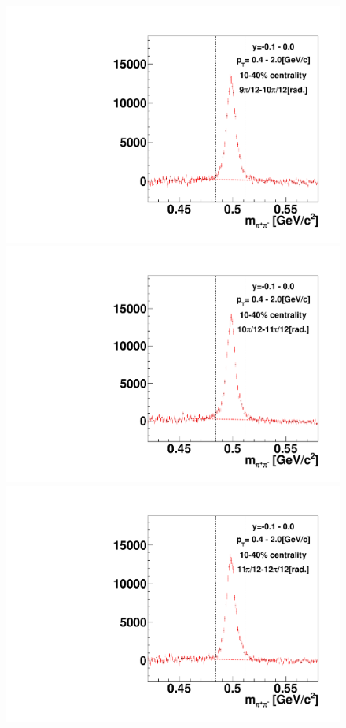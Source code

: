\begin{figure}[h]
\includegraphics[width=0.14\linewidth]{chapterX/fig/ks_v1_sig/kf_ptslice0_cent1_ks_flow_phi10_rap5.pdf}
\includegraphics[width=0.14\linewidth]{chapterX/fig/ks_v1_sig/kf_ptslice0_cent1_ks_flow_phi11_rap5.pdf}
\includegraphics[width=0.14\linewidth]{chapterX/fig/ks_v1_sig/kf_ptslice0_cent1_ks_flow_phi12_rap5.pdf}


\end{figure}

